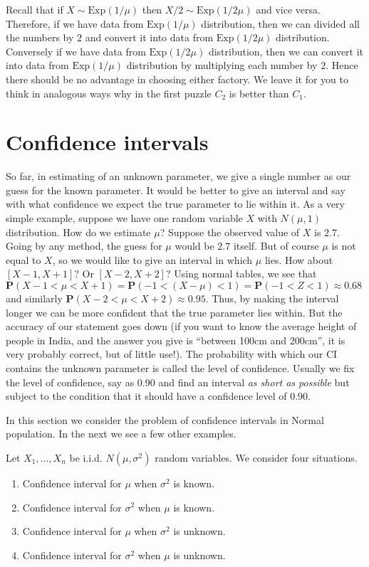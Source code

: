 \documentclass[preprint,  11pt]{amsart}
\newcommand{\para}[1]{\vspace{4mm}\noindent{\bfseries #1:}}
\theoremstyle{plain} %
\theoremstyle{definition} %
\begin{document}
Recall that if $X\sim \mbox{Exp}(1/\mu)$ then $X/2\sim \mbox{Exp}(1/2\mu)$ and vice versa. Therefore, if we have data from $\mbox{Exp}(1/\mu)$ distribution, then we can divided all the numbers by $2$ and convert it into data from $\mbox{Exp}(1/2\mu)$ distribution. Conversely if we have data from $\mbox{Exp}(1/2\mu)$ distribution, then we can convert it into data from $\mbox{Exp}(1/\mu)$ distribution by multiplying each number by $2$. Hence there should be no advantage in choosing either factory. We leave it for you to think in analogous ways why in the first puzzle $C_{2}$ is better than $C_{1}$.


\section{Confidence intervals}
 So far, in estimating of an unknown parameter, we give a single number as our guess for the known parameter. It would be better to give an interval and say with what confidence we expect the true parameter to lie within it.  As a very simple example, suppose we have one random variable $X$ with $N(\mu,1)$ distribution. How do we estimate $\mu$? Suppose the observed value of $X$ is $2.7$. Going by any method, the guess for $\mu$ would be $2.7$ itself. But of course $\mu$ is not equal to $X$, so we would like to give an interval in which $\mu$ lies. How about $[X-1,X+1]$? Or $[X-2,X+2]$? Using normal tables, we see that $\mathbf{P}(X-1<\mu<X+1)=\mathbf{P}(-1<(X-\mu)<1)=\mathbf{P}(-1<Z<1) \approx 0.68$ and similarly $\mathbf{P}(X-2<\mu<X+2)\approx 0.95$. Thus, by making the interval longer we can be more confident that the true parameter lies within. But the accuracy of our statement goes down (if you want to know the average height of people in India, and the answer you give is ``between 100cm and 200cm'', it is very probably correct, but of little use!). The probability with which our CI contains the unknown parameter is called the level of confidence. Usually we fix the level of confidence, say as $0.90$ and find an interval {\em as short as possible} but subject to the condition that it should have a confidence level of $0.90$.
 
 In this section we consider the problem of confidence intervals in Normal population. In the next we see a few other examples.
 
\para{The setting} Let $X_{1},\ldots ,X_{n}$ be i.i.d. $N(\mu,{\sigma}^{2})$ random variables. We consider four situations.
\begin{enumerate}\setlength\itemsep{6pt}
\item Confidence interval for $\mu$ when ${\sigma}^{2}$ is known.
\item Confidence interval for ${\sigma}^{2}$ when $\mu$ is known.
\item Confidence interval for $\mu$ when ${\sigma}^{2}$ is unknown.
\item Confidence interval for ${\sigma}^{2}$ when $\mu$ is unknown.
\end{enumerate}
\end{document}
